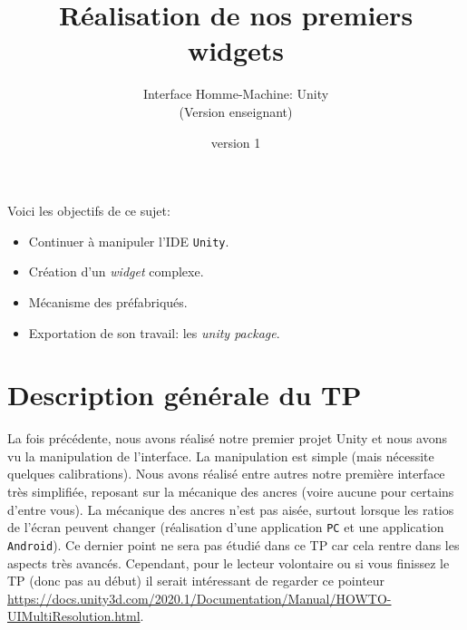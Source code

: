\documentclass[a4paper,10pt]{article}
\newenvironment{attention}%
{\begin{tcolorbox}[breakable,colback=green!25!white,colframe=red!55!black,title=Attention]}%
{\end{tcolorbox}}
\begin{document}
	


\title{\vspace*{-1cm}Réalisation de nos premiers widgets}
\author{\vspace*{-1.5cm}Interface Homme-Machine: Unity
\begin{ensnote}
	(Version enseignant)
\end{ensnote}
}
\date{\vspace*{-1.5cm}version 1}
\maketitle
\thispagestyle{fancy}

Voici les objectifs de ce sujet:
\begin{itemize}
	\item Continuer à manipuler l'IDE \texttt{Unity}.
	\item Création d'un \textit{widget} complexe.
	\item Mécanisme des préfabriqués.
	\item Exportation de son travail: les \textit{unity package}.
\end{itemize}


%	

\section*{Description générale du TP}

La fois précédente, nous avons réalisé notre premier projet Unity et nous avons vu la manipulation de l'interface. La manipulation est simple (mais nécessite quelques calibrations). Nous avons réalisé entre autres notre première interface très simplifiée, reposant sur la mécanique des ancres (voire aucune pour certains d'entre vous). La mécanique des ancres n'est pas aisée, surtout lorsque les ratios de l'écran peuvent changer (réalisation d'une application \texttt{PC} et une application \texttt{Android}). Ce dernier point ne sera pas étudié dans ce TP car cela rentre dans les aspects très avancés. Cependant, pour le lecteur volontaire ou si vous finissez le TP (donc pas au début) il serait intéressant de regarder ce pointeur \url{https://docs.unity3d.com/2020.1/Documentation/Manual/HOWTO-UIMultiResolution.html}. 
\end{document}
